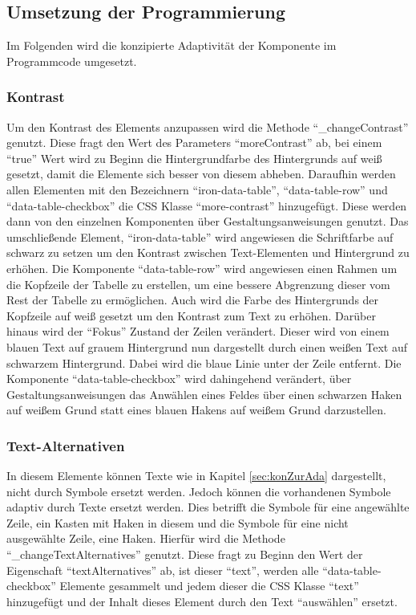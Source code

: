 \documentclass[12pt, paper=a4, bibtotoc, toc=listof, headsepline=true]{scrreprt}
\begin{document}
	\subsection{Umsetzung der Programmierung}
	Im Folgenden wird die konzipierte Adaptivität der Komponente im Programmcode umgesetzt.
	\subsubsection{Kontrast}
	Um den Kontrast des Elements anzupassen wird die Methode \enquote{\_changeContrast} genutzt. Diese fragt den Wert des Parameters \enquote{moreContrast} ab, bei einem \enquote{true} Wert wird zu Beginn die Hintergrundfarbe des Hintergrunds auf weiß gesetzt, damit die Elemente sich besser von diesem abheben. Daraufhin werden allen Elementen mit den Bezeichnern \enquote{iron-data-table}, \enquote{data-table-row} und \enquote{data-table-checkbox} die CSS Klasse \enquote{more-contrast} hinzugefügt. Diese werden dann von den einzelnen Komponenten über Gestaltungsanweisungen genutzt. Das umschließende Element, \enquote{iron-data-table} wird angewiesen die Schriftfarbe auf schwarz zu setzen um den Kontrast zwischen Text-Elementen und Hintergrund zu erhöhen. Die Komponente \enquote{data-table-row} wird angewiesen einen Rahmen um die Kopfzeile der Tabelle zu erstellen, um eine bessere Abgrenzung dieser vom Rest der Tabelle zu ermöglichen. Auch wird die Farbe des Hintergrunds der Kopfzeile auf weiß gesetzt um den Kontrast zum Text zu erhöhen. Darüber hinaus wird der \enquote{Fokus} Zustand der Zeilen verändert. Dieser wird von einem blauen Text auf grauem Hintergrund nun dargestellt durch einen weißen Text auf schwarzem Hintergrund. Dabei wird die blaue Linie unter der Zeile entfernt. Die Komponente \enquote{data-table-checkbox} wird dahingehend verändert, über Gestaltungsanweisungen das Anwählen eines Feldes über einen schwarzen Haken auf weißem Grund statt eines blauen Hakens auf weißem Grund darzustellen.
	\subsubsection{Text-Alternativen}
	In diesem Elemente können Texte wie in Kapitel \ref{sec:konZurAda} dargestellt, nicht durch Symbole ersetzt werden. Jedoch können die vorhandenen Symbole adaptiv durch Texte ersetzt werden. Dies betrifft die Symbole für eine angewählte Zeile, ein Kasten mit Haken in diesem und die Symbole für eine nicht ausgewählte Zeile, eine Haken. Hierfür wird die Methode \enquote{\_changeTextAlternatives} genutzt. Diese fragt zu Beginn den Wert der Eigenschaft \enquote{textAlternatives} ab, ist dieser \enquote{text}, werden alle \enquote{data-table-checkbox} Elemente gesammelt und jedem dieser die CSS Klasse \enquote{text} hinzugefügt und der Inhalt dieses Element durch den Text \enquote{auswählen} ersetzt. 
\end{document}
